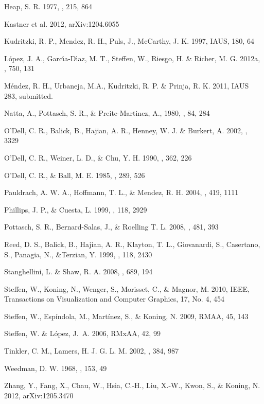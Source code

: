 \documentclass{aa}
\begin{document}
\begin{thebibliography}{}
 Heap, S. R. 1977, \apj, 215, 864

 Kastner et al. 2012, arXiv:1204.6055

 Kudritzki, R. P., Mendez,
  R. H., Puls, J., McCarthy, J. K. 1997, IAUS, 180, 64

  
 L\'opez, J. A., Garc\'{\i}a-D\'{\i}az, M. T., Steffen, W., Riesgo, H. \& Richer, M. G. 2012a, \apj, 750, 131


 M\'endez, R. H., Urbaneja,
  M.A., Kudritzki, R. P. \& Prinja, R. K. 2011, IAUS 283, submitted.

 Natta, A., Pottasch, S. R., \&
  Preite-Martinez, A., 1980, \aap, 84, 284
  
 O'Dell, C. R., Balick, B., Hajian, A. R., Henney, W. J.
  \& Burkert, A. 2002, , 3329

 O'Dell, C. R., Weiner,
  L. D., \& Chu, Y. H. 1990, \apj, 362, 226

 O'Dell, C. R., \& Ball,
  M. E. 1985, \apj, 289, 526

 Pauldrach, A. W. A.,
  Hoffmann, T. L., \& Mendez, R. H. 2004, \aap, 419, 1111

 Phillips, J. P., \&
  Cuesta, L. 1999, \aj, 118, 2929

 Pottasch, S. R., Bernard-Salas, J.,
  \& Roelling T. L.  2008, \aap, 481, 393

 Reed, D. S., Balick, B., Hajian, A. R.,
  Klayton, T. L., Giovanardi, S., Casertano, S., Panagia, N., \&Terzian, Y.
  1999, \aj, 118, 2430
  
  Stanghellini, L. \& Shaw, R. A. 2008, \apj, 689, 194
  
  Steffen, W., Koning, N., Wenger, S., Morisset, C., \& Magnor, M.
 2010, IEEE, Transactions on Visualization and Computer Graphics, 17, No. 4, 454 

 Steffen, W., Esp\'indola, M.,
  Mart\'inez, S., \& Koning, N. 2009, RMAA, 45, 143
  
 Steffen, W. \& L{\'o}pez, J.~A.
  2006, RMxAA, 42, 99 

 Tinkler, C. M., Lamers,
  H. J. G. L. M. 2002, \aap, 384, 987

 Weedman, D. W. 1968, \apj, 153, 49

 Zhang, Y., Fang, X., Chau, W., Hsia, C.-H., Liu, X.-W., Kwon, S., \& Koning, N. 2012, arXiv:1205.3470

\end{thebibliography}
\end{document}

